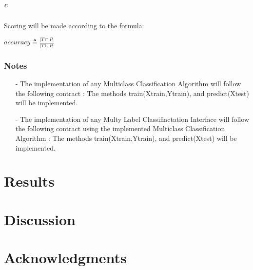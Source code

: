 \documentclass[10pt,letterpaper]{article}
\begin{document}
	\subparagraph{c}Scoring will be made according to the formula:
	\begin{center}
		$accuracy \triangleq \frac{|T \cap P|}{|T \cup P |}$
	\end{center}
	
	\subsubsection*{Notes}
	\begin{itemize}
		\item[-] The implementation of any Multiclass Classification Algorithm will follow the following contract : The methods train(Xtrain,Ytrain), and predict(Xtest) will be implemented.
		
		\item[-] The implementation of any Multy Label Classifiactation Interface will follow the following contract using the implemented Multiclass Classification Algorithm  : The methods train(Xtrain,Ytrain), and predict(Xtest) will be implemented.

	\end{itemize}
	
	
	
	
	
	\newpage
	
	\section*{Results}

	\section*{Discussion}
	
	
\section*{Acknowledgments}




	
\end{document}
